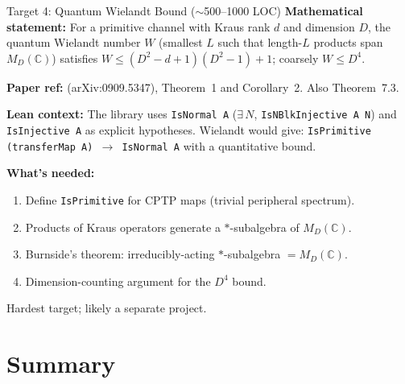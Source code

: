 \documentclass[aspectratio=169,10pt]{beamer}
\begin{document}
\begin{frame}{Target 4: Quantum Wielandt Bound (\texorpdfstring{$\sim$500--1000}{~500-1000} LOC)}
    \small
    \textbf{Mathematical statement:}
    For a primitive channel with Kraus rank $d$ and dimension $D$, the quantum Wielandt number
    $W$ (smallest $L$ such that length-$L$ products span $M_D(\mathbb{C})$) satisfies
    $W \leq (D^2 - d + 1)(D^2 - 1) + 1$; coarsely $W \leq D^4$.

    \vspace{0.3em}
    \textbf{Paper ref:} \cite{Sanz2010Quantum} (arXiv:0909.5347), Theorem~1 and Corollary~2.
    Also \cite{Wolf2012Quantum} Theorem~7.3.

    \vspace{0.3em}
    \textbf{Lean context:}
    The library uses \texttt{IsNormal A} ($\exists\, N$, \texttt{IsNBlkInjective A N}) and
    \texttt{IsInjective A} as explicit hypotheses.
    Wielandt would give: \texttt{IsPrimitive (transferMap A) $\to$ IsNormal A} with a quantitative bound.

    \vspace{0.3em}
    \textbf{What's needed:}
    \begin{enumerate}
        \item Define \texttt{IsPrimitive} for CPTP maps (trivial peripheral spectrum).
        \item Products of Kraus operators generate a $*$-subalgebra of $M_D(\mathbb{C})$.
        \item Burnside's theorem: irreducibly-acting $*$-subalgebra $= M_D(\mathbb{C})$.
        \item Dimension-counting argument for the $D^4$ bound.
    \end{enumerate}
    \textcolor{softred}{Hardest target; likely a separate project.}
\end{frame}

\section{Summary}
\end{document}
